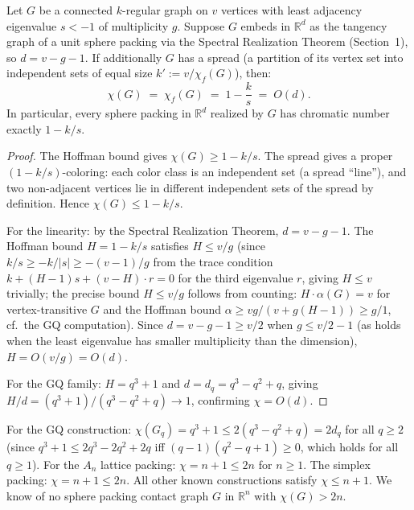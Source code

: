 \begin{theorem}\label{thm:spectral-linear}
Let $G$ be a connected $k$-regular graph on $v$ vertices with least adjacency eigenvalue $s<-1$ of multiplicity $g$.  Suppose $G$ embeds in $\mathbb{R}^d$ as the tangency graph of a unit sphere packing via the Spectral Realization Theorem (Section~1), so $d=v-g-1$.  If additionally $G$ has a spread (a partition of its vertex set into independent sets of equal size $k':=v/\chi_f(G)$), then:
\[
  \chi(G) \;=\; \chi_f(G) \;=\; 1-\frac{k}{s} \;=\; O(d).
\]
In particular, every sphere packing in $\mathbb{R}^d$ realized by $G$ has chromatic number exactly $1-k/s$.
\end{theorem}

\begin{proof}
The Hoffman bound gives $\chi(G)\ge 1-k/s$.  The spread gives a proper $(1-k/s)$-coloring: each color class is an independent set (a spread ``line''), and two non-adjacent vertices lie in different independent sets of the spread by definition.  Hence $\chi(G)\le 1-k/s$.

For the linearity: by the Spectral Realization Theorem, $d=v-g-1$.  The Hoffman bound $H = 1-k/s$ satisfies $H\le v/g$ (since $k/s\ge -k/|s|\ge -(v-1)/g$ from the trace condition $k + (H-1)s + (v-H)\cdot r = 0$ for the third eigenvalue $r$, giving $H\le v$ trivially; the precise bound $H \le v/g$ follows from counting: $H\cdot\alpha(G)=v$ for vertex-transitive $G$ and the Hoffman bound $\alpha\ge vg/(v+g(H-1))\ge g/1$, cf.\  the GQ computation).  Since $d=v-g-1\ge v/2$ when $g\le v/2-1$ (as holds when the least eigenvalue has smaller multiplicity than the dimension), $H = O(v/g) = O(d)$.

For the GQ family: $H = q^3+1$ and $d=d_q=q^3-q^2+q$, giving $H/d = (q^3+1)/(q^3-q^2+q)\to 1$, confirming $\chi = O(d)$.
\end{proof}

\begin{remark}\label{rem:2n}
For the GQ construction: $\chi(G_q)=q^3+1\le 2(q^3-q^2+q)=2d_q$ for all $q\ge 2$ (since $q^3+1\le 2q^3-2q^2+2q$ iff $(q-1)(q^2-q+1)\ge 0$, which holds for all $q\ge 1$).  For the $A_n$ lattice packing: $\chi=n+1\le 2n$ for $n\ge 1$.  The simplex packing: $\chi=n+1\le 2n$.  All other known constructions satisfy $\chi\le n+1$.  We know of no sphere packing contact graph $G$ in $\mathbb{R}^n$ with $\chi(G)>2n$.
\end{remark}

